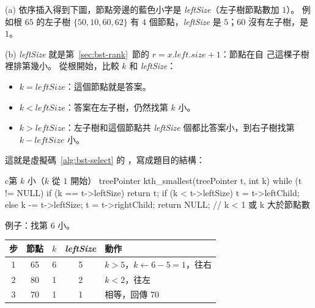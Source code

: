 (a) 依序插入得到下圖，節點旁邊的藍色小字是 \textit{leftSize}（左子樹節點數加 $1$）。 例如根
$65$ 的左子樹 $\{50, 10, 60, 62\}$ 有 $4$ 個節點，\textit{leftSize} 是 $5$；$60$ 沒有左子樹，是
$1$。

\begin{center}
\end{center}

(b) \textit{leftSize} 就是第~\ref{sec:bst-rank}~節的 $r = x.\mathit{left}.\mathit{size} + 1$：節點在自
己這棵子樹裡排第幾小。 從根開始，比較 $k$ 和 \textit{leftSize}：
\begin{itemize}
\item $k = \textit{leftSize}$：這個節點就是答案。
\item $k < \textit{leftSize}$：答案在左子樹，仍然找第 $k$ 小。
\item $k > \textit{leftSize}$：左子樹和這個節點共 \textit{leftSize} 個都比答案小，到右子樹找第
$k - \textit{leftSize}$ 小。
\end{itemize}
這就是虛擬碼~\ref{alg:bst-select} 的 ，寫成題目的結構：

\begin{code}{c}{第 $k$ 小（$k$ 從 $1$ 開始）}
treePointer kth_smallest(treePointer t, int k)
{
    while (t != NULL) {
        if (k == t->leftSize)
            return t;
        if (k < t->leftSize) {
            t = t->leftChild;
        } else {
            k -= t->leftSize;
            t = t->rightChild;
        }
    }
    return NULL;            // k < 1 或 k 大於節點數
}
\end{code}

例子：找第 $6$ 小。

\begin{center}
\begin{tabular}{ccccl}
\toprule
步 & 節點 & $k$ & \textit{leftSize} & 動作 \\
\midrule
1 & 65 & 6 & 5 & $k > 5$，$k \gets 6 - 5 = 1$，往右 \\
2 & 80 & 1 & 2 & $k < 2$，往左 \\
3 & 70 & 1 & 1 & 相等，回傳 $70$ \\
\bottomrule
\end{tabular}
\end{center}

